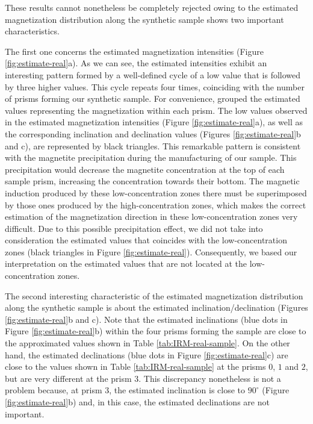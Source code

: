 \documentclass[galley,gc]{agutex}
\begin{document}
\begin{article}
These results cannot nonetheless be completely rejected owing to
the estimated magnetization
distribution along the synthetic sample shows two important 
characteristics. 

The first one concerns the estimated magnetization intensities 
(Figure \ref{fig:estimate-real}a).
As we can see, the estimated intensities exhibit an interesting pattern 
formed by a well-defined cycle of a low value that is followed by three higher 
values. This cycle repeats four times,
coinciding with the number of prisms forming our synthetic
sample.
For convenience, grouped the estimated values representing
the magnetization within each prism.
The low values observed in the estimated magnetization intensities
(Figure \ref{fig:estimate-real}a), as well
as the corresponding inclination and declination values
(Figures \ref{fig:estimate-real}b and c), are represented by black
triangles.
This remarkable pattern is consistent with the 
magnetite precipitation during the manufacturing of our sample.
This precipitation would decrease the magnetite concentration at the
top of each sample prism, increasing the concentration towards
their bottom.
The magnetic induction produced by these low-concentration zones
there must be superimposed by those ones produced by the 
high-concentration zones, which makes the correct estimation 
of the magnetization direction in these low-concentration zones 
very difficult.
Due to this possible precipitation effect, 
we did not take into consideration the estimated values that coincides
with the low-concentration zones 
(black triangles in Figure \ref{fig:estimate-real}). Consequently,
we based our interpretation on the estimated values that are 
not located at the low-concentration zones.

The second interesting characteristic of the estimated magnetization
distribution along the synthetic sample is about the estimated
inclination/declination (Figures \ref{fig:estimate-real}b and c).
Note that the estimated inclinations (blue dots in Figure 
\ref{fig:estimate-real}b) within the four prisms forming
the sample are close to the approximated values shown in Table 
\ref{tab:IRM-real-sample}.
On the other hand, the estimated declinations (blue dots in Figure 
\ref{fig:estimate-real}c) are close to the values shown in Table 
\ref{tab:IRM-real-sample} at the prisms $0$, $1$ and $2$, but are 
very different at the prism $3$.
This discrepancy nonetheless is not a problem because, at prism $3$,
the estimated inclination is close to $90^{\circ}$ (Figure
\ref{fig:estimate-real}b) and, in this case, the estimated declinations
are not important.


\end{article}
\end{document}
